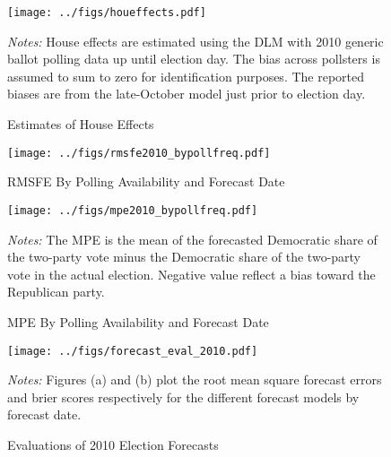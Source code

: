 \documentclass[12pt,final,fleqn]{article}
\theoremstyle{plain}
\begin{document}
\begin{figure}[!htb]
\begin{center}
\texttt{[image: ../figs/houeffects.pdf]}
\vspace{.5cm}
\caption{Estimates of House Effects}
\label{fig:house-effects}
\begin{minipage}{\linewidth}
\footnotesize
\emph{Notes:} House effects are estimated using the DLM with 2010 generic ballot polling data up until election day. The bias across pollsters is assumed to sum to zero for identification purposes. The reported biases are from the late-October model just prior to election day.
\end{minipage}
\end{center}
\end{figure}

\begin{figure}[!htb]
\begin{center}
\texttt{[image: ../figs/rmsfe2010\_bypollfreq.pdf]}
\vspace{.5cm}
\caption{RMSFE By Polling Availability and Forecast Date}
\label{fig:RMSFE By Polling Availability and Forecast Date}
\begin{minipage}{\linewidth}
\footnotesize
\end{minipage}
\end{center}
\end{figure}

\begin{figure}[!htb]
\begin{center}
\texttt{[image: ../figs/mpe2010\_bypollfreq.pdf]}
\vspace{.5cm}
\caption{MPE By Polling Availability and Forecast Date}
\label{fig:MPE By Polling Availability and Forecast Date}
\begin{minipage}{\linewidth}
\footnotesize
\emph{Notes:} The MPE is the mean of the forecasted Democratic share of the two-party vote minus the Democratic share of the two-party vote in the actual election. Negative value reflect a bias toward the Republican party.
\end{minipage}
\end{center}
\end{figure}

\begin{figure}[!htb]
\centering
\texttt{[image: ../figs/forecast\_eval\_2010.pdf]}
\vspace{.5cm}
\caption{Evaluations of 2010 Election Forecasts}
\label{fig:Evaluations of 2010 Election Forecasts}
\begin{minipage}{\linewidth}
\footnotesize
\emph{Notes:} Figures (a) and (b) plot the root mean square forecast errors and brier scores respectively for the different forecast models by forecast date. 
\end{minipage}
\end{figure}
\end{document}
